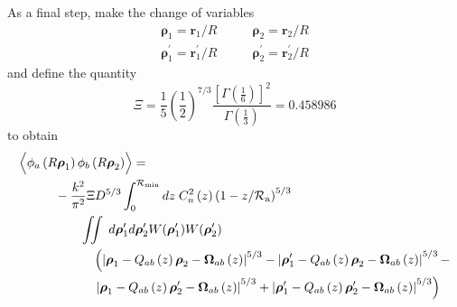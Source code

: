 As a final step, make the change of variables
\begin{equation}
\begin{aligned}
\boldsymbol{\rho}_{1} = \boldsymbol{r}_{1}/R \quad & \quad \boldsymbol{\rho}_{2} = \boldsymbol{r}_{2}/R \\
\boldsymbol{\rho}^{\prime}_{1} = \boldsymbol{r}^{\prime}_{1}/R \quad & \quad \boldsymbol{\rho}^{\prime}_{2} = \boldsymbol{r}^{\prime}_{2}/R
\end{aligned}
\end{equation}
and define the quantity 
\begin{equation}\label{Xi}
\Xi = \frac{1}{5}\left(\frac{1}{2}\right)^{7/3} \frac{\left[\Gamma\left(\frac{1}{6}\right)\right]^{2}}{\Gamma\left(\frac{1}{3}\right)} = 0.458986
\end{equation}
to obtain
\begin{equation}\label{prphase_n7}
\begin{aligned}
&\left\langle \vphantom{\hat{\phi}_{a}} \phi_{a}\left(R\boldsymbol{\rho}_{1}\right) \phi_{b}\left(R\boldsymbol{\rho}_{2}\right)\right\rangle = \\ 
&\quad\quad\quad
 -\frac{k^{2}}{\pi^{2}} \Xi D^{5/3}
\int_{0}^{\mathcal{R}_{\rm min}} dz\;C_{n}^{2}\left(z\right) \left(1 - z/\mathcal{R}_{\rm a}\right)^{5/3}\\
& \quad\quad\quad\quad\quad
\iint \; d\boldsymbol{\rho}^{\prime}_{1}d\boldsymbol{\rho}^{\prime}_{2}  
W(\boldsymbol{\rho}^{\prime}_{1}) W(\boldsymbol{\rho}^{\prime}_{2}) \\
& \quad\quad\quad\quad\quad\quad
\left(\left\vert \boldsymbol{\rho}_{1}  - Q_{ab}\left(z\right)\boldsymbol{\rho}_{2} - \boldsymbol{\Omega}_{ab}\left(z\right)\right\vert^{5/3} -
\left\vert \boldsymbol{\rho}^{\prime}_{1}  - Q_{ab}\left(z\right)\boldsymbol{\rho}_{2} - \boldsymbol{\Omega}_{ab}\left(z\right)\right\vert^{5/3} -
\right. \\
& \quad\quad\quad\quad\quad\quad
\left.
\left\vert \boldsymbol{\rho}_{1}  - Q_{ab}\left(z\right)\boldsymbol{\rho}^{\prime}_{2} - \boldsymbol{\Omega}_{ab}\left(z\right)\right\vert^{5/3} + 
\left\vert \boldsymbol{\rho}^{\prime}_{1}  - Q_{ab}\left(z\right)\boldsymbol{\rho}^{\prime}_{2} - \boldsymbol{\Omega}_{ab}\left(z\right)\right\vert^{5/3}\right)
\end{aligned}
\end{equation}

